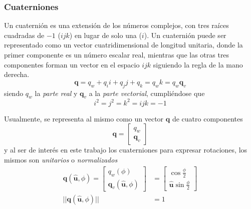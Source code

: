 \subsubsection{Cuaterniones}
Un cuaternión es una extensión de los números complejos, con tres raíces cuadradas de $-1$ ($ijk$) en lugar de solo una ($i$). Un cuaternión puede ser representado como un vector cuatridimensional de longitud unitaria, donde la primer componente es un número escalar real, mientras que las otras tres componentes forman un vector en el espacio $ijk$ siguiendo la regla de la mano derecha. 
\begin{equation}
    \bm{q} = q_w + q_i i + q_j j + q_k = q_w k = q_w \bm{q}_v
\end{equation}
siendo $q_w$ la \textit{parte real} y $\bm{q}_v$ a la \textit{parte vectorial}, cumpliéndose que
\begin{equation}
    i^2=j^2=k^2=ijk=-1
\end{equation}

Usualmente, se representa al mismo como un vector $\bm{q}$ de cuatro componentes
\begin{equation}
    \bm{q} =
    \begin{bmatrix}
    q_w \\
    \bm{q}_v
    \end{bmatrix}
\end{equation}
y al ser de interés en este trabajo los cuaterniones para expresar rotaciones, los mismos son \textit{unitarios} o \textit{normalizados}
\begin{align}
    \bm{q}(\hat{\bm{u}},\phi) =
    \begin{bmatrix}
    q_w(\phi) \\
    \bm{q}_v(\hat{\bm{u}},\phi)
    \end{bmatrix}
    &=
    \begin{bmatrix}
        \cos{\frac{\phi}{2}} \\
        \hat{\bm{u}}\sin{\frac{\phi}{2}}
    \end{bmatrix}
    \\
    ||\bm{q}(\hat{\bm{u}},\phi)|| &= 1
\end{align}


